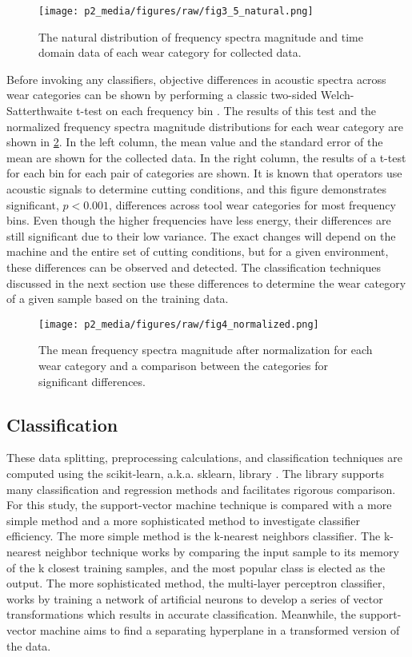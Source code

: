 \begin{figure}[t!]
\centering
\texttt{[image: p2\_media/figures/raw/fig3\_5\_natural.png]}
\caption{
The natural distribution of frequency spectra magnitude 
and time domain data of each wear category for collected data.
}
\label{fig:natural}
\end{figure}

Before invoking any classifiers, objective differences in acoustic spectra across wear 
categories can be shown by performing a classic two-sided Welch-Satterthwaite t-test on each frequency bin \cite{Tamhane2000}.
The results of this test and the normalized frequency spectra magnitude distributions
for each wear category are shown in \ref{fig:sigs}.
In the left column, the mean value and the standard error of the mean are shown for the collected data.
In the right column, the results of a t-test for each bin for each pair of categories are shown.
It is known that operators use acoustic signals to determine cutting conditions,
and this figure demonstrates significant, $p < 0.001$, differences across tool wear categories
for most frequency bins. Even though the higher frequencies have less energy, their differences
are still significant due to their low variance.
The exact changes will depend on the machine and the entire set of cutting conditions, but 
for a given environment, these differences can be observed and detected.
The classification techniques discussed in the next section use these differences to 
determine the wear category of a given sample based on the training data.

\begin{figure}[t!]
\centering
\texttt{[image: p2\_media/figures/raw/fig4\_normalized.png]}
\caption{
The mean frequency spectra magnitude after normalization for each wear category and a 
comparison between the categories for significant differences.
}
\label{fig:sigs}
\end{figure}

\subsection{Classification}

These data splitting, preprocessing calculations, and classification techniques are 
computed using the scikit-learn, a.k.a. sklearn, library \cite{JMLR:v12:pedregosa11a}.
The library supports many classification and regression methods and facilitates rigorous comparison.
For this study, the support-vector machine technique is compared with a more simple method 
and a more sophisticated method to investigate classifier efficiency. 
The more simple method is the k-nearest neighbors classifier. 
The k-nearest neighbor technique works by comparing the input 
sample to its memory of the k closest training samples, and the most popular 
class is elected as the output. The more sophisticated method, 
the multi-layer perceptron classifier, works by training a network of artificial 
neurons to develop a series of vector transformations which results in accurate classification. 
Meanwhile, the support-vector machine aims to find a separating hyperplane in a transformed version of the data.

